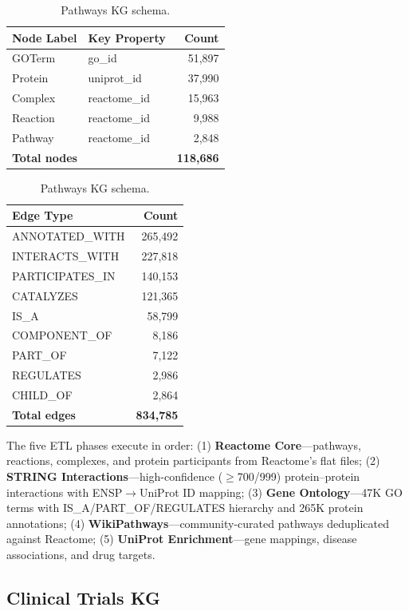 \documentclass[11pt]{article}
\begin{document}
\begin{table}[H]
\centering
\caption{Pathways KG schema.}
\label{tab:pathways-schema}
\small
\begin{tabular}{llr}
\toprule
\textbf{Node Label} & \textbf{Key Property} & \textbf{Count} \\
\midrule
GOTerm & go\_id & 51,897 \\
Protein & uniprot\_id & 37,990 \\
Complex & reactome\_id & 15,963 \\
Reaction & reactome\_id & 9,988 \\
Pathway & reactome\_id & 2,848 \\
\midrule
\multicolumn{2}{l}{\textbf{Total nodes}} & \textbf{118,686} \\
\bottomrule
\end{tabular}
\quad
\begin{tabular}{lr}
\toprule
\textbf{Edge Type} & \textbf{Count} \\
\midrule
ANNOTATED\_WITH & 265,492 \\
INTERACTS\_WITH & 227,818 \\
PARTICIPATES\_IN & 140,153 \\
CATALYZES & 121,365 \\
IS\_A & 58,799 \\
COMPONENT\_OF & 8,186 \\
PART\_OF & 7,122 \\
REGULATES & 2,986 \\
CHILD\_OF & 2,864 \\
\midrule
\textbf{Total edges} & \textbf{834,785} \\
\bottomrule
\end{tabular}
\end{table}

The five ETL phases execute in order: (1) \textbf{Reactome Core}---pathways, reactions, complexes, and protein participants from Reactome's flat files; (2) \textbf{STRING Interactions}---high-confidence ($\geq$700/999) protein--protein interactions with ENSP$\rightarrow$UniProt ID mapping; (3) \textbf{Gene Ontology}---47K GO terms with IS\_A/PART\_OF/REGULATES hierarchy and 265K protein annotations; (4) \textbf{WikiPathways}---community-curated pathways deduplicated against Reactome; (5) \textbf{UniProt Enrichment}---gene mappings, disease associations, and drug targets.

\subsection{Clinical Trials KG}
\end{document}
